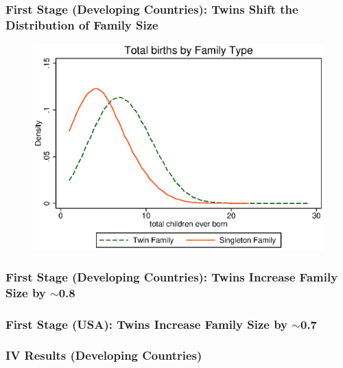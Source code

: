 \documentclass[9pt,letterpaper,subeqn]{beamer}
\begin{document}
\begin{frame}[label=FS1]
\frametitle{First Stage (Developing Countries): Twins Shift the Distribution of Family Size}
\begin{figure}[htpb!]
\centering
  \includegraphics[scale=0.75]{./figures/famsize.eps}
\end{figure}
\end{frame}


\begin{frame}[label=Fstage]
\frametitle{First Stage (Developing Countries): Twins Increase Family Size by $\sim$0.8}

\end{frame}

\begin{frame}[label=Fstage]
\frametitle{First Stage (USA): Twins Increase Family Size by $\sim$0.7}

\end{frame}



\begin{frame}[label=IV]
\frametitle{IV Results (Developing Countries)}

\hyperlink{DHSGender}{}
\hyperlink{IVFees}{}
\end{frame}
\end{document}
